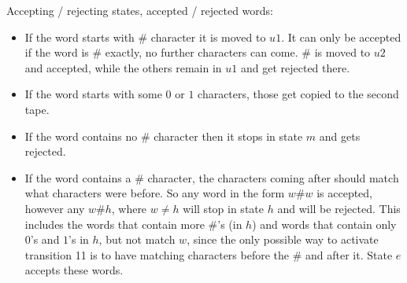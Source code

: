 Accepting / rejecting states, accepted / rejected words:

\begin{itemize}
    \item If the word starts with $\#$ character it is moved to $u1$. It can only be accepted if the word is $\#$ exactly, no further characters can come. $\#$ is moved to $u2$ and accepted, while the others remain in $u1$ and get rejected there.
    \item If the word starts with some $0$ or $1$ characters, those get copied to the second tape.
    \item If the word contains no $\#$ character then it stops in state $m$ and gets rejected.
    \item If the word contains a $\#$ character, the characters coming after should match what characters were before. So any word in the form $w\#w$ is accepted, however any $w\#h$, where $w\neq{}h$ will stop in state $h$ and will be rejected. This includes the words that contain more $\#$'s (in $h$) and words that contain only $0$'s and $1$'s in $h$, but not match $w$, since the only possible way to activate transition 11 is to have matching characters before the $\#$ and after it. State $e$ accepts these words.
\end{itemize}
